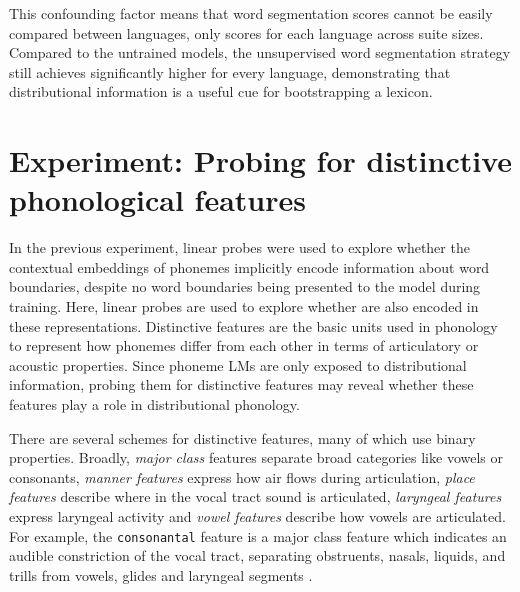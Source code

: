 This confounding factor means that word segmentation scores cannot be easily compared between languages, only scores for each language across suite sizes. Compared to the untrained models, the unsupervised word segmentation strategy still achieves significantly higher \fscores for every language, demonstrating that distributional information is a useful cue for bootstrapping a lexicon. 


\section{Experiment: Probing for distinctive phonological features}\label{sec:15-featureprobing}

In the previous experiment, linear probes were used to explore whether the contextual embeddings of phonemes implicitly encode information about word boundaries, despite no word boundaries being presented to the model during training. Here, linear probes are used to explore whether  are also encoded in these representations. Distinctive features are the basic units used in phonology to represent how phonemes differ from each other in terms of articulatory or acoustic properties. Since phoneme LMs are only exposed to distributional information, probing them for distinctive features may reveal whether these features play a role in distributional phonology. 

There are several schemes for distinctive features, many of which use binary properties. Broadly, \emph{major class} features separate broad categories like vowels or consonants, \emph{manner features} express how air flows during articulation, \emph{place features} describe where in the vocal tract sound is articulated, \emph{laryngeal features} express laryngeal activity and \emph{vowel features} describe how vowels are articulated. For example, the \texttt{consonantal} feature is a major class feature which indicates an audible constriction of the vocal tract, separating obstruents, nasals, liquids, and trills from vowels, glides and laryngeal segments \citep{gussenhoven2017understanding}.

